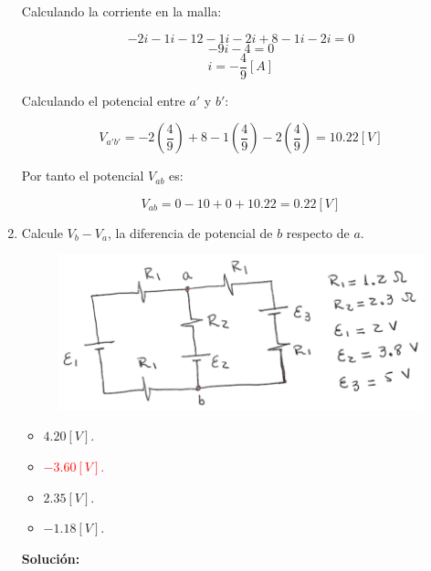 \documentclass[letter,11pt]{article}
\begin{document}
\begin{enumerate}
Calculando la corriente en la malla:

\begin{equation*}
    -2i-1i-12-1i-2i+8-1i-2i = 0
\end{equation*}
\begin{equation*}
    -9i-4 = 0
\end{equation*}
\begin{equation*}
    i = -\frac{4}{9}[A]
\end{equation*}

Calculando el potencial entre $a'$ y $b'$:

\begin{equation*}
    V_{a'b'} = -2\left(\frac{4}{9}\right)+8-1\left(\frac{4}{9}\right)-2\left(\frac{4}{9}\right) = 10.22 [V]
\end{equation*}

Por tanto el potencial $V_{ab}$ es:

\begin{equation*}
    V_{ab} = 0-10+0+10.22 = 0.22 [V]
\end{equation*}

\item Calcule $V_b - V_a$, la diferencia de potencial de $b$ respecto de $a$.

\begin{figure}[!h]
\centering
\includegraphics[scale=2.00]{resources/q8.eps}
\end{figure}

\begin{itemize}
    \item $ 4.20 [V]$.
    \item \textcolor{red}{$-3.60 [V]$.}
    \item $ 2.35 [V]$.
    \item $-1.18 [V]$.
\end{itemize}

\textbf{Solución:}


\end{enumerate}
\end{document}
